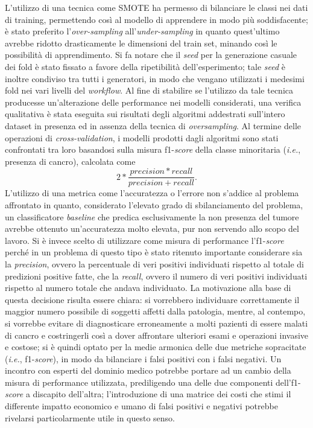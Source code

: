 L'utilizzo di una tecnica come SMOTE ha permesso di bilanciare le classi nei dati di training, permettendo così al modello di apprendere in modo più soddisfacente; è stato preferito l'\textit{over-sampling} all'\textit{under-sampling} in quanto quest'ultimo avrebbe ridotto drasticamente le dimensioni del train set, minando così le possibilità di apprendimento.
Si fa notare che il \textit{seed} per la generazione casuale dei fold è stato fissato a favore della ripetibilità dell'esperimento; tale \textit{seed} è inoltre condiviso tra tutti i generatori, in modo che vengano utilizzati i medesimi fold nei vari livelli del \textit{workflow}.
Al fine di stabilire se l'utilizzo da tale tecnica producesse un'alterazione delle performance nei modelli considerati, una verifica qualitativa è stata eseguita sui risultati degli algoritmi addestrati sull'intero dataset in presenza ed in assenza della tecnica di \textit{oversampling}.
Al termine delle operazioni di \textit{cross-validation}, i modelli prodotti dagli algoritmi sono stati confrontati tra loro basandosi sulla misura f1-\textit{score} della classe minoritaria (\textit{i.e.}, presenza di cancro), calcolata come \[2 * \frac{precision*recall}{precision+recall}.\]
L'utilizzo di una metrica come l'accuratezza o l'errore non s'addice al problema affrontato in quanto, considerato l'elevato grado di sbilanciamento del problema, un classificatore \textit{baseline} che predica esclusivamente la non presenza del tumore avrebbe ottenuto un'accuratezza molto elevata, pur non servendo allo scopo del lavoro. 
Si è invece scelto di utilizzare come misura di performance l'f1-\textit{score} perché in un problema di questo tipo è stato ritenuto importante considerare sia la \textit{precision}, ovvero la percentuale di veri positivi individuati rispetto al totale di predizioni positive fatte, che la \textit{recall}, ovvero il numero di veri positivi individuati rispetto al numero totale che andava individuato. 
La motivazione alla base di questa decisione risulta essere chiara: si vorrebbero individuare correttamente il maggior numero possibile di soggetti affetti dalla patologia, mentre, al contempo, si vorrebbe evitare di diagnosticare erroneamente a molti pazienti di essere malati di cancro e costringerli così a dover affrontare ulteriori esami e operazioni invasive e costose; si è quindi optato per la medie armonica delle due metriche sopracitate (\textit{i.e.}, f1-\textit{score}), in modo da bilanciare i falsi positivi con i falsi negativi.
Un incontro con esperti del dominio medico potrebbe portare ad un cambio della misura di performance utilizzata, prediligendo una delle due componenti dell'f1-\textit{score} a discapito dell'altra; l'introduzione di una matrice dei costi che stimi il differente impatto economico e umano di falsi positivi e negativi potrebbe rivelarsi particolarmente utile in questo senso.\\
